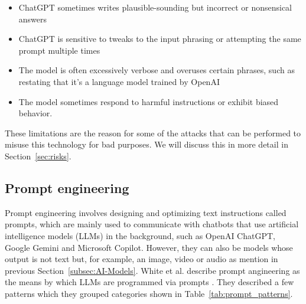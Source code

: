 \begin{itemize}
    \item ChatGPT sometimes writes plausible-sounding but incorrect or nonsensical answers
    \item ChatGPT is sensitive to tweaks to the input phrasing or attempting the same prompt multiple times
    \item The model is often excessively verbose and overuses certain phrases, such as restating that it’s a language model trained by OpenAI
    \item The model sometimes respond to harmful instructions or exhibit biased behavior.
\end{itemize}

These limitations are the reason for some of the attacks that can be performed to misuse this technology for bad purposes. We will discuss this in more detail in Section~\ref{sec:risks}.


\subsection{Prompt engineering}
Prompt engineering involves designing and optimizing text instructions called prompts, which are mainly used to communicate with chatbots that use artificial intelligence models (LLMs) in the background, such as OpenAI ChatGPT, Google Gemini and Microsoft Copilot. However, they can also be models whose output is not text but, for example, an image, video or audio as mention in previous Section~\ref{subsec:AI-Models}. White et al. describe prompt angineering as the means by which LLMs are programmed via prompts \cite{white2023promptpatterncatalogenhance}. They described a few patterns which they grouped categories shown in Table~\ref{tab:prompt_patterns}.

